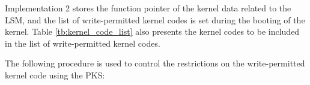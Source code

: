 Implementation 2 stores the function pointer of the kernel data related to
the LSM, and the list of write-permitted kernel codes is set during the booting of the kernel.
Table \ref{tb:kernel_code_list} also presents the kernel codes to be included in
the list of write-permitted kernel codes.



The following procedure is used to control the restrictions on the write-permitted
kernel code using the PKS:

